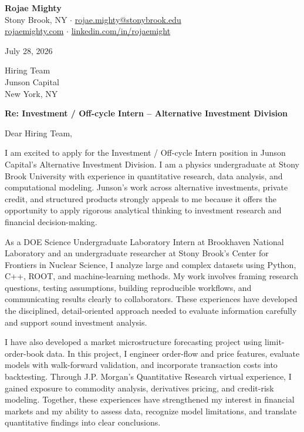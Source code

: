 \documentclass[10pt,letterpaper]{article}
\begin{document}
\textbf{Rojae Mighty}\\
Stony Brook, NY \quad$\cdot$\quad
\href{mailto:rojae.mighty@stonybrook.edu}{rojae.mighty@stonybrook.edu}\\
\href{https://rojaemighty.com}{rojaemighty.com} \quad$\cdot$\quad
\href{https://www.linkedin.com/in/rojaemight/}{linkedin.com/in/rojaemight}

\vspace{8pt}
July 28, 2026

\vspace{8pt}
Hiring Team\\
Junson Capital\\
New York, NY

\vspace{8pt}
\textbf{Re: Investment / Off-cycle Intern -- Alternative Investment Division}

\vspace{4pt}
Dear Hiring Team,

I am excited to apply for the Investment / Off-cycle Intern position in Junson Capital's Alternative Investment Division. I am a physics undergraduate at Stony Brook University with experience in quantitative research, data analysis, and computational modeling. Junson's work across alternative investments, private credit, and structured products strongly appeals to me because it offers the opportunity to apply rigorous analytical thinking to investment research and financial decision-making.

As a DOE Science Undergraduate Laboratory Intern at Brookhaven National Laboratory and an undergraduate researcher at Stony Brook's Center for Frontiers in Nuclear Science, I analyze large and complex datasets using Python, C++, ROOT, and machine-learning methods. My work involves framing research questions, testing assumptions, building reproducible workflows, and communicating results clearly to collaborators. These experiences have developed the disciplined, detail-oriented approach needed to evaluate information carefully and support sound investment analysis.

I have also developed a market microstructure forecasting project using limit-order-book data. In this project, I engineer order-flow and price features, evaluate models with walk-forward validation, and incorporate transaction costs into backtesting. Through J.P. Morgan's Quantitative Research virtual experience, I gained exposure to commodity analysis, derivatives pricing, and credit-risk modeling. Together, these experiences have strengthened my interest in financial markets and my ability to assess data, recognize model limitations, and translate quantitative findings into clear conclusions.
\end{document}
